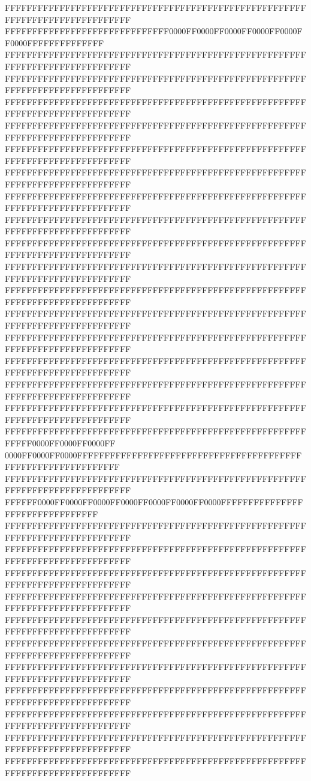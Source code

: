 FFFFFFFFFFFFFFFFFFFFFFFFFFFFFFFFFFFFFFFFFFFFFFFFFFFFFFFFFFFFFFFFFFFFFFFFFFFFFF
FFFFFFFFFFFFFFFFFFFFFFFFFFFFFF0000FF0000FF0000FF0000FF0000FF0000FFFFFFFFFFFFFF
FFFFFFFFFFFFFFFFFFFFFFFFFFFFFFFFFFFFFFFFFFFFFFFFFFFFFFFFFFFFFFFFFFFFFFFFFFFFFF
FFFFFFFFFFFFFFFFFFFFFFFFFFFFFFFFFFFFFFFFFFFFFFFFFFFFFFFFFFFFFFFFFFFFFFFFFFFFFF
FFFFFFFFFFFFFFFFFFFFFFFFFFFFFFFFFFFFFFFFFFFFFFFFFFFFFFFFFFFFFFFFFFFFFFFFFFFFFF
FFFFFFFFFFFFFFFFFFFFFFFFFFFFFFFFFFFFFFFFFFFFFFFFFFFFFFFFFFFFFFFFFFFFFFFFFFFFFF
FFFFFFFFFFFFFFFFFFFFFFFFFFFFFFFFFFFFFFFFFFFFFFFFFFFFFFFFFFFFFFFFFFFFFFFFFFFFFF
FFFFFFFFFFFFFFFFFFFFFFFFFFFFFFFFFFFFFFFFFFFFFFFFFFFFFFFFFFFFFFFFFFFFFFFFFFFFFF
FFFFFFFFFFFFFFFFFFFFFFFFFFFFFFFFFFFFFFFFFFFFFFFFFFFFFFFFFFFFFFFFFFFFFFFFFFFFFF
FFFFFFFFFFFFFFFFFFFFFFFFFFFFFFFFFFFFFFFFFFFFFFFFFFFFFFFFFFFFFFFFFFFFFFFFFFFFFF
FFFFFFFFFFFFFFFFFFFFFFFFFFFFFFFFFFFFFFFFFFFFFFFFFFFFFFFFFFFFFFFFFFFFFFFFFFFFFF
FFFFFFFFFFFFFFFFFFFFFFFFFFFFFFFFFFFFFFFFFFFFFFFFFFFFFFFFFFFFFFFFFFFFFFFFFFFFFF
FFFFFFFFFFFFFFFFFFFFFFFFFFFFFFFFFFFFFFFFFFFFFFFFFFFFFFFFFFFFFFFFFFFFFFFFFFFFFF
FFFFFFFFFFFFFFFFFFFFFFFFFFFFFFFFFFFFFFFFFFFFFFFFFFFFFFFFFFFFFFFFFFFFFFFFFFFFFF
FFFFFFFFFFFFFFFFFFFFFFFFFFFFFFFFFFFFFFFFFFFFFFFFFFFFFFFFFFFFFFFFFFFFFFFFFFFFFF
FFFFFFFFFFFFFFFFFFFFFFFFFFFFFFFFFFFFFFFFFFFFFFFFFFFFFFFFFFFFFFFFFFFFFFFFFFFFFF
FFFFFFFFFFFFFFFFFFFFFFFFFFFFFFFFFFFFFFFFFFFFFFFFFFFFFFFFFFFFFFFFFFFFFFFFFFFFFF
FFFFFFFFFFFFFFFFFFFFFFFFFFFFFFFFFFFFFFFFFFFFFFFFFFFFFFFFFFFFFFFFFFFFFFFFFFFFFF
FFFFFFFFFFFFFFFFFFFFFFFFFFFFFFFFFFFFFFFFFFFFFFFFFFFFFFFFFFFF0000FF0000FF0000FF
0000FF0000FF0000FFFFFFFFFFFFFFFFFFFFFFFFFFFFFFFFFFFFFFFFFFFFFFFFFFFFFFFFFFFFFF
FFFFFFFFFFFFFFFFFFFFFFFFFFFFFFFFFFFFFFFFFFFFFFFFFFFFFFFFFFFFFFFFFFFFFFFFFFFFFF
FFFFFF0000FF0000FF0000FF0000FF0000FF0000FF0000FFFFFFFFFFFFFFFFFFFFFFFFFFFFFFFF
FFFFFFFFFFFFFFFFFFFFFFFFFFFFFFFFFFFFFFFFFFFFFFFFFFFFFFFFFFFFFFFFFFFFFFFFFFFFFF
FFFFFFFFFFFFFFFFFFFFFFFFFFFFFFFFFFFFFFFFFFFFFFFFFFFFFFFFFFFFFFFFFFFFFFFFFFFFFF
FFFFFFFFFFFFFFFFFFFFFFFFFFFFFFFFFFFFFFFFFFFFFFFFFFFFFFFFFFFFFFFFFFFFFFFFFFFFFF
FFFFFFFFFFFFFFFFFFFFFFFFFFFFFFFFFFFFFFFFFFFFFFFFFFFFFFFFFFFFFFFFFFFFFFFFFFFFFF
FFFFFFFFFFFFFFFFFFFFFFFFFFFFFFFFFFFFFFFFFFFFFFFFFFFFFFFFFFFFFFFFFFFFFFFFFFFFFF
FFFFFFFFFFFFFFFFFFFFFFFFFFFFFFFFFFFFFFFFFFFFFFFFFFFFFFFFFFFFFFFFFFFFFFFFFFFFFF
FFFFFFFFFFFFFFFFFFFFFFFFFFFFFFFFFFFFFFFFFFFFFFFFFFFFFFFFFFFFFFFFFFFFFFFFFFFFFF
FFFFFFFFFFFFFFFFFFFFFFFFFFFFFFFFFFFFFFFFFFFFFFFFFFFFFFFFFFFFFFFFFFFFFFFFFFFFFF
FFFFFFFFFFFFFFFFFFFFFFFFFFFFFFFFFFFFFFFFFFFFFFFFFFFFFFFFFFFFFFFFFFFFFFFFFFFFFF
FFFFFFFFFFFFFFFFFFFFFFFFFFFFFFFFFFFFFFFFFFFFFFFFFFFFFFFFFFFFFFFFFFFFFFFFFFFFFF
FFFFFFFFFFFFFFFFFFFFFFFFFFFFFFFFFFFFFFFFFFFFFFFFFFFFFFFFFFFFFFFFFFFFFFFFFFFFFF
